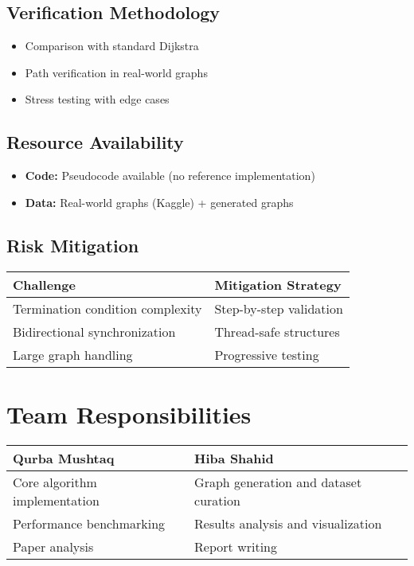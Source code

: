 \documentclass[12pt]{article}
\begin{document}
\subsection{Verification Methodology}
\begin{itemize}
    \item Comparison with standard Dijkstra
    \item Path verification in real-world graphs
    \item Stress testing with edge cases
\end{itemize}

\subsection{Resource Availability}
\begin{itemize}
    \item \textbf{Code:} Pseudocode available (no reference implementation)
    \item \textbf{Data:} Real-world graphs (Kaggle) + generated graphs
\end{itemize}

\subsection{Risk Mitigation}
\begin{center}
\begin{tabular}{p{6cm}|p{6cm}}
\toprule
\textbf{Challenge} & \textbf{Mitigation Strategy} \\
\midrule
Termination condition complexity & Step-by-step validation \\
Bidirectional synchronization & Thread-safe structures \\
Large graph handling & Progressive testing \\
\bottomrule
\end{tabular}
\end{center}

\section{Team Responsibilities}
\begin{center}
\begin{tabular}{p{}|p{}}
\toprule
\textbf{Qurba Mushtaq} & \textbf{Hiba Shahid} \\
\midrule
Core algorithm implementation & Graph generation and dataset curation \\
Performance benchmarking & Results analysis and visualization \\
Paper analysis & Report writing \\
\bottomrule
\end{tabular}
\end{center}
\end{document}
